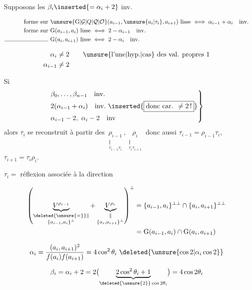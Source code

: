 Supposons les $\beta_i\inserted{=\alpha_i+2}$ inv.

\[
\begin{aligned}
\text{forme sur }&\unsure{\mathrm{G}|\mathcal G|Q|\mathcal Q|\mathcal O}(a_{i-1},\unsure{a_i|\tau_i},a_{i+1})\ \text{lisse}\iff\alpha_{i-1}+\alpha_i\quad\text{inv.}\\
\text{forme sur }&\mathrm{G}(a_{i-1},a_i)\ \text{lisse}\iff 2-\alpha_{i-1}\quad\text{inv.}\\
\text{\rule{2.6cm}{0.35pt} }&\mathrm{G}(a_i,a_{i+1})\ \text{lisse}\iff 2-\alpha_i\quad\text{inv.}
\end{aligned}
\]


\[
\begin{aligned}
\alpha_{i}&\ne 2\qquad\text{\unsure{l'une|hyp.|cas} des val. propres }1\\
\alpha_{i-1}&\ne 2
\end{aligned}
\]

 Si
\[
\left.\begin{aligned}
&\beta_0,\ldots,\beta_{n-1}\quad\text{inv.}\\
&2(\alpha_{i-1}+\alpha_i)\quad\text{inv.}\ \inserted{\boxed{\text{donc car. }\ne2\,!}}\\
&\alpha_{i-1}-2,\ \alpha_i-2\quad\text{inv}
\end{aligned}\right\}
\]
alors $\tau_i$ se reconstruit à partir des $\underset{\substack{\Vert\\ \tau_{i-1}\tau_i}}{\rho_{i-1}},\underset{\substack{\Vert\\ \tau_i\tau_{i+1}}}{\rho_i}$ donc aussi $\tau_{i-1}=\rho_{i-1}\tau_i$, $\tau_{i+1}=\tau_i\rho_i$.

$\tau_i={}$ réflexion associée à la direction

\[
\begin{aligned}
\left(
\underbrace{V^{\rho_{i-1}}}_{\substack{\deleted{\unsure{=}}\Vert\\\{a_{i-1},a_i\}^{\perp}}}
+\underbrace{V^{\rho_i}}_{\substack{\Vert\\\{a_i,a_{i+1}\}^{\perp}}}
\right)^{\perp}
&=\{a_{i-1},a_i\}^{\perp\perp}\cap\{a_i,a_{i+1}\}^{\perp\perp}\\
&=\mathrm{G}(a_{i-1},a_i)\cap\mathrm{G}(a_i,a_{i+1})
\end{aligned}
\]

\[
\alpha_i=\frac{(a_i,a_{i+1})^2}{f(a_i)f(a_{i+1})}=4\cos^2\theta_i\ \deleted{\unsure{\cos 2|\alpha_i\cos 2}}
\]

\[
\beta_i=\alpha_i+2=2\bigl(\underbrace{2\cos^{2}\theta_i+1}_{\deleted{\unsure{2}}\cos 2\theta_i}\bigr)=4\cos2\theta_i
\]
